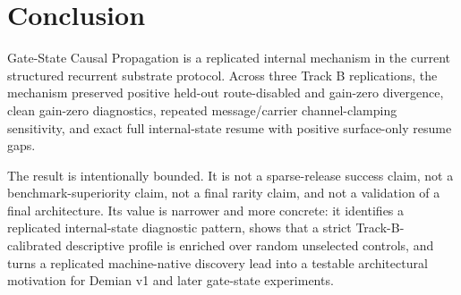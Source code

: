 \documentclass[11pt]{article}
\begin{document}
\section{Conclusion}

Gate-State Causal Propagation is a replicated internal mechanism in the current
structured recurrent substrate protocol. Across three Track B replications,
the mechanism preserved positive held-out route-disabled and gain-zero
divergence, clean gain-zero diagnostics, repeated message/carrier
channel-clamping sensitivity, and exact full internal-state resume with
positive surface-only resume gaps.

The result is intentionally bounded. It is not a sparse-release success claim,
not a benchmark-superiority claim, not a final rarity claim, and not a
validation of a final architecture. Its value is narrower and more concrete:
it identifies a replicated internal-state diagnostic pattern, shows that a
strict Track-B-calibrated descriptive profile is enriched over random
unselected controls, and turns a replicated machine-native discovery lead into
a testable architectural motivation for Demian v1 and later gate-state
experiments.



\end{document}
